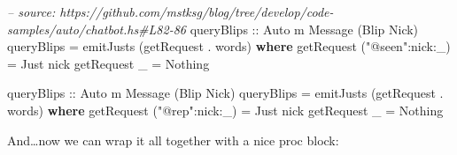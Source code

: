 \documentclass[]{article}
\newenvironment{Shaded}{}{}
\newcommand{\KeywordTok}[1]{\textcolor[rgb]{0.00,0.44,0.13}{\textbf{{#1}}}}
\newcommand{\DataTypeTok}[1]{\textcolor[rgb]{0.56,0.13,0.00}{{#1}}}
\newcommand{\StringTok}[1]{\textcolor[rgb]{0.25,0.44,0.63}{{#1}}}
\newcommand{\CommentTok}[1]{\textcolor[rgb]{0.38,0.63,0.69}{\textit{{#1}}}}
\newcommand{\OtherTok}[1]{\textcolor[rgb]{0.00,0.44,0.13}{{#1}}}
\newcommand{\FunctionTok}[1]{\textcolor[rgb]{0.02,0.16,0.49}{{#1}}}
\newcommand{\NormalTok}[1]{{#1}}
\begin{document}
\begin{Shaded}
\begin{Highlighting}[]
\CommentTok{-- source: https://github.com/mstksg/blog/tree/develop/code-samples/auto/chatbot.hs#L82-86}
\OtherTok{    queryBlips ::} \DataTypeTok{Auto} \NormalTok{m }\DataTypeTok{Message} \NormalTok{(}\DataTypeTok{Blip} \DataTypeTok{Nick}\NormalTok{)}
    \NormalTok{queryBlips }\FunctionTok{=} \NormalTok{emitJusts (getRequest }\FunctionTok{.} \NormalTok{words)}
      \KeywordTok{where}
        \NormalTok{getRequest (}\StringTok{"@seen"}\FunctionTok{:}\NormalTok{nick}\FunctionTok{:}\NormalTok{_) }\FunctionTok{=} \DataTypeTok{Just} \NormalTok{nick}
        \NormalTok{getRequest _                }\FunctionTok{=} \DataTypeTok{Nothing}



\OtherTok{queryBlips ::} \DataTypeTok{Auto} \NormalTok{m }\DataTypeTok{Message} \NormalTok{(}\DataTypeTok{Blip} \DataTypeTok{Nick}\NormalTok{)}
\NormalTok{queryBlips }\FunctionTok{=} \NormalTok{emitJusts (getRequest }\FunctionTok{.} \NormalTok{words)}
  \KeywordTok{where}
    \NormalTok{getRequest (}\StringTok{"@rep"}\FunctionTok{:}\NormalTok{nick}\FunctionTok{:}\NormalTok{_) }\FunctionTok{=} \DataTypeTok{Just} \NormalTok{nick}
    \NormalTok{getRequest _                }\FunctionTok{=} \DataTypeTok{Nothing}
\end{Highlighting}
\end{Shaded}

And\ldots{}now we can wrap it all together with a nice proc block:
\end{document}
